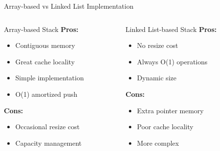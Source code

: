 \documentclass[aspectratio=169,xcolor=dvipsnames]{beamer}
\begin{document}
\begin{frame}{Array-based vs Linked List Implementation}
  \begin{columns}
    \begin{column}{0.48\textwidth}
      \begin{block}{Array-based Stack}
        \textbf{Pros:}
        \begin{itemize}
          \item Contiguous memory
          \item Great cache locality
          \item Simple implementation
          \item O(1) amortized push
        \end{itemize}
        
        \textbf{Cons:}
        \begin{itemize}
          \item Occasional resize cost
          \item Capacity management
        \end{itemize}
      \end{block}
    \end{column}
    \begin{column}{0.48\textwidth}
      \begin{block}{Linked List-based Stack}
        \textbf{Pros:}
        \begin{itemize}
          \item No resize cost
          \item Always O(1) operations
          \item Dynamic size
        \end{itemize}
        
        \textbf{Cons:}
        \begin{itemize}
          \item Extra pointer memory
          \item Poor cache locality
          \item More complex
        \end{itemize}
      \end{block}
    \end{column}
  \end{columns}
\end{frame}
\end{document}
